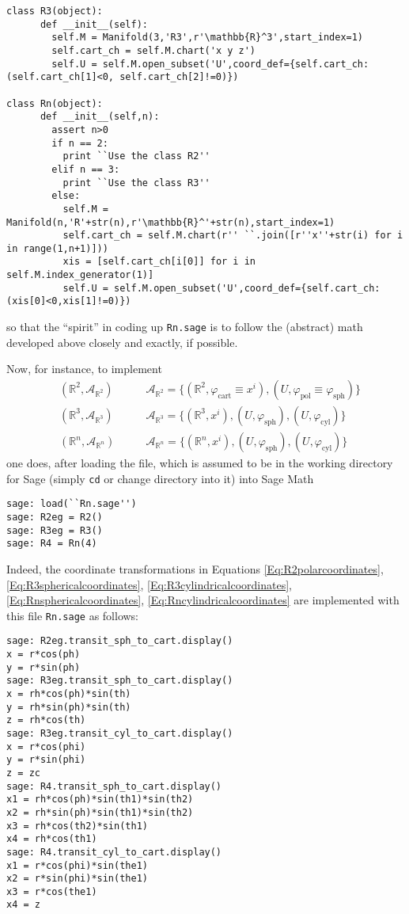\documentclass[10pt, twoside]{amsart}
\begin{document}
\begin{multicols*}{2}
\begin{lstlisting}
class R3(object):
      def __init__(self):
        self.M = Manifold(3,'R3',r'\mathbb{R}^3',start_index=1)
        self.cart_ch = self.M.chart('x y z')
        self.U = self.M.open_subset('U',coord_def={self.cart_ch: (self.cart_ch[1]<0, self.cart_ch[2]!=0)})

class Rn(object):
      def __init__(self,n):
        assert n>0
        if n == 2:
          print ``Use the class R2''
        elif n == 3:
          print ``Use the class R3''
        else:
          self.M = Manifold(n,'R'+str(n),r'\mathbb{R}^'+str(n),start_index=1)
          self.cart_ch = self.M.chart(r'' ``.join([r''x''+str(i) for i in range(1,n+1)]))
          xis = [self.cart_ch[i[0]] for i in self.M.index_generator(1)]
          self.U = self.M.open_subset('U',coord_def={self.cart_ch:(xis[0]<0,xis[1]!=0)})
\end{lstlisting}
so that the ``spirit'' in coding up \verb|Rn.sage| is to follow the (abstract) math developed above closely and exactly, if possible.  

Now, for instance, to implement 
\[
\begin{aligned}
  & (\mathbb{R}^2, \mathcal{A}_{\mathbb{R}^2} ) \qquad & \mathcal{A}_{\mathbb{R}^2} = \lbrace ( \mathbb{R}^2, \varphi_{\text{cart}} \equiv x^i ), (U,\varphi_{\text{pol}} \equiv \varphi_{\text{sph}} ) \rbrace \\ 
  & (\mathbb{R}^3, \mathcal{A}_{\mathbb{R}^3} ) \qquad & \mathcal{A}_{\mathbb{R}^3} = \lbrace (\mathbb{R}^3, x^i ), (U,\varphi_{\text{sph}} ), (U,\varphi_{\text{cyl}}) \rbrace  \\ 
  & (\mathbb{R}^n, \mathcal{A}_{\mathbb{R}^n} ) \qquad & \mathcal{A}_{\mathbb{R}^n} = \lbrace (\mathbb{R}^n, x^i ), (U,\varphi_{\text{sph}} ), (U,\varphi_{\text{cyl}}) \rbrace  
\end{aligned}
\]
one does, after loading the file, which is assumed to be in the working directory for Sage (simply \verb|cd| or change directory into it) into Sage Math
\begin{lstlisting}
sage: load(``Rn.sage'')
sage: R2eg = R2()
sage: R3eg = R3()
sage: R4 = Rn(4)
\end{lstlisting}

Indeed, the coordinate transformations in Equations \ref{Eq:R2polarcoordinates}, \ref{Eq:R3sphericalcoordinates}, \ref{Eq:R3cylindricalcoordinates}, \ref{Eq:Rnsphericalcoordinates}, \ref{Eq:Rncylindricalcoordinates} are implemented with this file \verb|Rn.sage| as follows:
\begin{lstlisting}
sage: R2eg.transit_sph_to_cart.display()
x = r*cos(ph)
y = r*sin(ph)
sage: R3eg.transit_sph_to_cart.display()
x = rh*cos(ph)*sin(th)
y = rh*sin(ph)*sin(th)
z = rh*cos(th)
sage: R3eg.transit_cyl_to_cart.display()
x = r*cos(phi)
y = r*sin(phi)
z = zc
sage: R4.transit_sph_to_cart.display()
x1 = rh*cos(ph)*sin(th1)*sin(th2)
x2 = rh*sin(ph)*sin(th1)*sin(th2)
x3 = rh*cos(th2)*sin(th1)
x4 = rh*cos(th1)
sage: R4.transit_cyl_to_cart.display()
x1 = r*cos(phi)*sin(the1)
x2 = r*sin(phi)*sin(the1)
x3 = r*cos(the1)
x4 = z
\end{lstlisting}


\end{multicols*}
\end{document}

